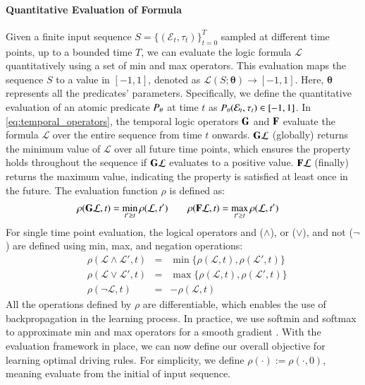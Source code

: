 \paragraph{Quantitative Evaluation of Formula}
Given a finite input sequence $S = \{(\mathcal{E}_t, \tau_t)\}_{t=0}^T$ sampled at different time points, up to a bounded time $T$, we can evaluate the logic formula $\mathcal{L}$ quantitatively using a set of min and max operators\cite{fainekos2009robustness, deshmukh2017robust}. This evaluation maps the sequence $S$ to a value in $[-1, 1]$, denoted as
$
    \mathcal{L}(S; \boldsymbol{\theta}) \rightarrow [-1, 1].
$
Here, $\boldsymbol{\theta}$ represents all the predicates' parameters.
Specifically, we define the quantitative evaluation of an atomic predicate $P_{\theta}$ at time $t$ as $P_{\theta}(\mathcal{E}_t, \tau_t) \in [-1, 1]$. In \eqref{eq:temporal_operators}, the temporal logic operators $\mathbf{G}$ and $\mathbf{F}$ evaluate the formula $\mathcal{L}$ over the entire sequence from time $t$ onwards. $\mathbf{G} \mathcal{L}$ (globally) returns the minimum value of $\mathcal{L}$ over all future time points, which ensures the property holds throughout the sequence if $\mathbf{G} \mathcal{L}$ evaluates to a positive value. $\mathbf{F} \mathcal{L}$ (finally) returns the maximum value, indicating the property is satisfied at least once in the future. The evaluation function $\rho$ is defined as:
\begin{equation}
    \begin{aligned}
        \rho(\mathbf{G} \mathcal{L}, t) & = \min_{t' \geq t} \rho(\mathcal{L}, t') \quad & \rho(\mathbf{F} \mathcal{L}, t) & = \max_{t' \geq t} \rho(\mathcal{L}, t')
    \end{aligned}
    \label{eq:temporal_operators}
\end{equation}
For single time point evaluation, the logical operators and ($\land$), or ($\lor$), and not ($\lnot$) are defined using min, max, and negation operations:
\begin{equation}
    \begin{aligned}
         & \rho(\mathcal{L} \land \mathcal{L}', t) & = & \min\{\rho(\mathcal{L}, t), \rho(\mathcal{L}', t)\} \\
         & \rho(\mathcal{L} \lor \mathcal{L}', t)  & = & \max\{\rho(\mathcal{L}, t), \rho(\mathcal{L}', t)\} \\
         & \rho(\lnot \mathcal{L}, t)              & = & -\rho(\mathcal{L}, t)
    \end{aligned}
    \label{eq:fol_operators}
\end{equation}
All the operations defined by $\rho$ are differentiable, which enables the use of backpropagation in the learning process.  In practice, we use softmin and softmax to approximate min and max operators for a smooth gradient \cite{Leung2020BackpropagationTS}. With the evaluation framework in place, we can now define our overall objective for learning optimal driving rules. For simplicity, we define $\rho(\cdot):= \rho(\cdot, 0)$, meaning evaluate from the initial of input sequence.

